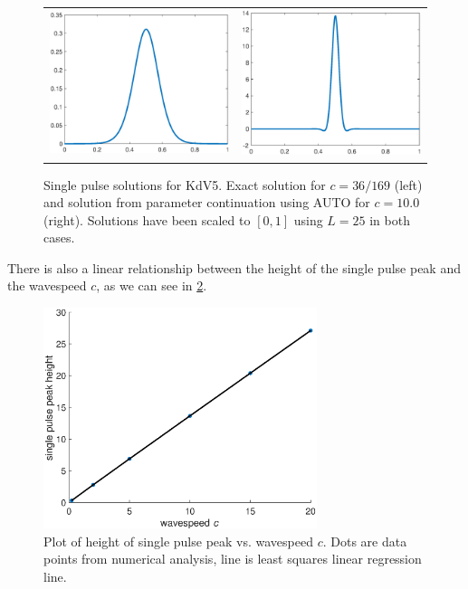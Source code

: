 \documentclass[thesis.tex]{subfiles}
\begin{document}
\begin{figure}
\begin{center}
\begin{tabular}{cc}
\includegraphics[width=8cm]{images/kdv5numerics/singleexact.eps} &
\includegraphics[width=8cm]{images/kdv5numerics/single10}
\end{tabular}
\caption{Single pulse solutions for KdV5. Exact solution for $c = 36/169$ (left) and solution from parameter continuation using AUTO for $c = 10.0$ (right). Solutions have been scaled to $[0, 1]$ using $L = 25$ in both cases.}
\label{fig:KdV5singlepulse}
\end{center}
\end{figure}

There is also a linear relationship between the height of the single pulse peak and the wavespeed $c$, as we can see in \cref{fig:KdV5peakht}.

\begin{figure}
\begin{center}
\includegraphics[width=8cm]{images/kdv5numerics/peakheightvsc}
\caption{Plot of height of single pulse peak vs. wavespeed $c$. Dots are data points from numerical analysis, line is least squares linear regression line.}
\label{fig:KdV5peakht}
\end{center}
\end{figure}
\end{document}
